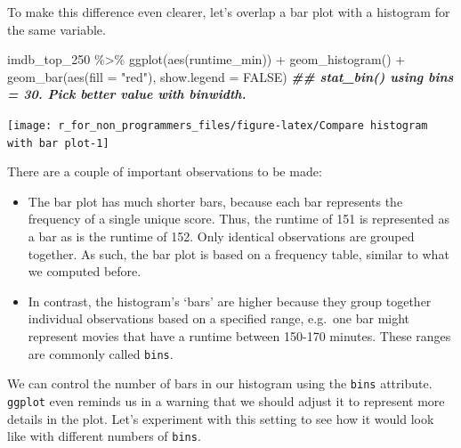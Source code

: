 \documentclass[
]{book}
\newenvironment{Shaded}{\begin{snugshade}}{\end{snugshade}}
\newcommand{\AttributeTok}[1]{\textcolor[rgb]{0.77,0.63,0.00}{#1}}
\newcommand{\ConstantTok}[1]{\textcolor[rgb]{0.00,0.00,0.00}{#1}}
\newcommand{\DocumentationTok}[1]{\textcolor[rgb]{0.56,0.35,0.01}{\textbf{\textit{#1}}}}
\newcommand{\FunctionTok}[1]{\textcolor[rgb]{0.00,0.00,0.00}{#1}}
\newcommand{\NormalTok}[1]{#1}
\newcommand{\SpecialCharTok}[1]{\textcolor[rgb]{0.00,0.00,0.00}{#1}}
\newcommand{\StringTok}[1]{\textcolor[rgb]{0.31,0.60,0.02}{#1}}
\begin{document}
To make this difference even clearer, let's overlap a bar plot with a histogram for the same variable.

\begin{Shaded}
\begin{Highlighting}[]
\NormalTok{imdb\_top\_250 }\SpecialCharTok{\%\textgreater{}\%} 
  \FunctionTok{ggplot}\NormalTok{(}\FunctionTok{aes}\NormalTok{(runtime\_min)) }\SpecialCharTok{+}
  \FunctionTok{geom\_histogram}\NormalTok{() }\SpecialCharTok{+}
  \FunctionTok{geom\_bar}\NormalTok{(}\FunctionTok{aes}\NormalTok{(}\AttributeTok{fill =} \StringTok{"red"}\NormalTok{), }\AttributeTok{show.legend =} \ConstantTok{FALSE}\NormalTok{)}
\DocumentationTok{\#\# \textasciigrave{}stat\_bin()\textasciigrave{} using \textasciigrave{}bins = 30\textasciigrave{}. Pick better value with \textasciigrave{}binwidth\textasciigrave{}.}
\end{Highlighting}
\end{Shaded}

\begin{center}\texttt{[image: r\_for\_non\_programmers\_files/figure-latex/Compare histogram with bar plot-1]} \end{center}

There are a couple of important observations to be made:

\begin{itemize}
\item
  The bar plot has much shorter bars, because each bar represents the frequency of a single unique score. Thus, the runtime of 151 is represented as a bar as is the runtime of 152. Only identical observations are grouped together. As such, the bar plot is based on a frequency table, similar to what we computed before.
\item
  In contrast, the histogram's `bars' are higher because they group together individual observations based on a specified range, e.g.~one bar might represent movies that have a runtime between 150-170 minutes. These ranges are commonly called \texttt{bins}.
\end{itemize}

We can control the number of bars in our histogram using the \texttt{bins} attribute. \texttt{ggplot} even reminds us in a warning that we should adjust it to represent more details in the plot. Let's experiment with this setting to see how it would look like with different numbers of \texttt{bins}.
\end{document}
